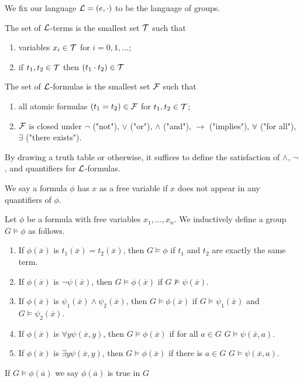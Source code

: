 \documentclass[../main.tex]{subfiles}
\begin{document}
We fix our language $\mathcal{L}=(e,\cdot)$ to be the language of groups.

\begin{definition}
    The set of $\mathcal{L}$-terms is the smallest set $\mathcal{T}$ such that \begin{enumerate}
        \item variables $x_i\in\mathcal{T}$ for $i=0,1,\dots$;
        \item if $t_1,t_2\in \mathcal{T}$ then $(t_1 \cdot t_2)\in \mathcal{T}$
    \end{enumerate}
\end{definition}

\begin{definition}
    The set of $\mathcal{L}$-formulas is the smallest set $\mathcal{F}$ such that \begin{enumerate}
        \item all atomic formulas $(t_1=t_2)\in\mathcal{F}$ for $t_1,t_2\in \mathcal{T}$;
        \item $\mathcal{F}$ is closed under $\neg$ ("not"), $\vee$ ("or"), $\wedge$ ("and"), $\rightarrow$ ("implies"), $\forall$ ("for all"), $\exists$ ("there exists").
    \end{enumerate}
\end{definition}

By drawing a truth table or otherwise, it suffices to define the satisfaction of $\wedge$, $\neg$, and quantifiers for $\mathcal{L}$-formulas.

\begin{definition}
    We say a formula $\phi$ has $x$ as a free variable if $x$ does not appear in any quantifiers of $\phi$.
\end{definition}

\begin{definition}
    Let $\phi$ be a formula with free variables $x_1,\dots,x_n$. We inductively define a group $G\models \phi$ as follows. \begin{enumerate}
        \item If $\phi(\overline x)$ is $t_1(\overline x)=t_2(\overline x)$, then $G\models \phi$ if $t_1$ and $t_2$ are exactly the same term.
        \item If $\phi(\overline x)$ is $\neg \psi(\overline x)$, then $G\models \phi(\overline x)$ if $G \nvDash \psi(\overline x)$.
        \item If $\phi(\overline x)$ is $\psi_1(\overline x) \wedge \psi_2(\overline x)$, then $G\models \phi(\overline x)$ if $G\models \psi_1(\overline x)$ and $G\models \psi_2(\overline x)$.
        \item If $\phi(\overline x)$ is $\forall y\psi(\overline x,y)$, then $G\models \phi(\overline x)$ if for all $a \in G$  $G\models \psi(\overline x, a)$.
        \item If $\phi(\overline x)$ is $\exists y\psi(\overline x,y)$, then $G\models \phi(\overline x)$ if there is $a \in G$  $G\models \psi(\overline x, a)$.
    \end{enumerate}

    If $G\models \phi(\overline a)$ we say $\phi(\overline a)$ is true in $G$
\end{definition}
\end{document}
